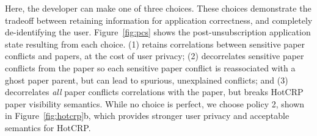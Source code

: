 Here, the developer can make one of three choices.
These choices demonstrate the tradeoff between retaining information for application correctness, and completely de-identifying the user.
Figure~\ref{fig:pcs} shows the post-unsubscription application state resulting from each choice.
%
(1) retains correlations between sensitive paper conflicts and papers, at the cost of
user privacy; (2) decorrelates sensitive paper conflicts from the paper so each
sensitive paper conflict is reassociated with a ghost paper parent, but can lead to spurious,
unexplained conflicts; and (3) decorrelates \emph{all} paper conflicts correlations
with the paper, but breaks HotCRP paper visibility semantics.
While no choice is perfect, we choose policy 2, shown in Figure~\ref{fig:hotcrp}b, which provides
stronger user privacy and acceptable semantics for HotCRP.

%
%

